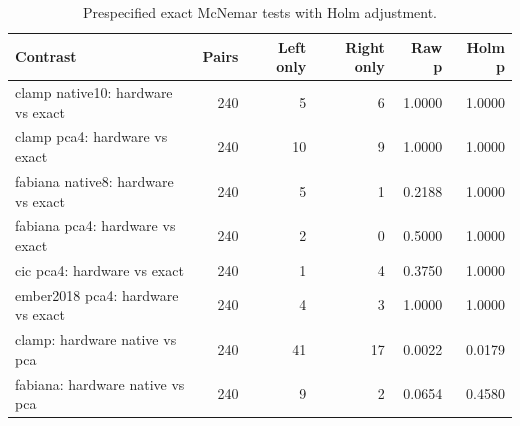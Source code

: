 \begin{table}[tbp]
\caption{Prespecified exact McNemar tests with Holm adjustment.}
\label{tab:paired-contrasts}
\begin{tabular}{lrrrrr}
\toprule
Contrast & Pairs & Left only & Right only & Raw p & Holm p \\
\midrule
clamp native10: hardware vs exact & 240 & 5 & 6 & 1.0000 & 1.0000 \\
clamp pca4: hardware vs exact & 240 & 10 & 9 & 1.0000 & 1.0000 \\
fabiana native8: hardware vs exact & 240 & 5 & 1 & 0.2188 & 1.0000 \\
fabiana pca4: hardware vs exact & 240 & 2 & 0 & 0.5000 & 1.0000 \\
cic pca4: hardware vs exact & 240 & 1 & 4 & 0.3750 & 1.0000 \\
ember2018 pca4: hardware vs exact & 240 & 4 & 3 & 1.0000 & 1.0000 \\
clamp: hardware native vs pca & 240 & 41 & 17 & 0.0022 & 0.0179 \\
fabiana: hardware native vs pca & 240 & 9 & 2 & 0.0654 & 0.4580 \\
\bottomrule
\end{tabular}
\end{table}
